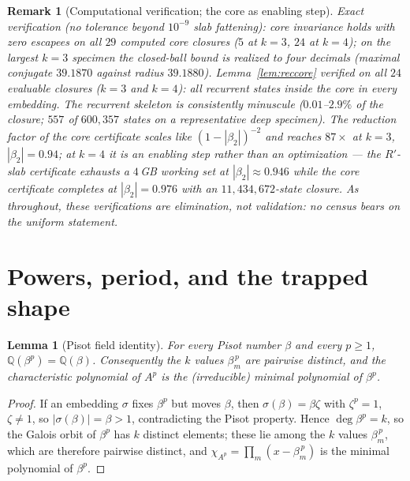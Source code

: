 \documentclass[11pt]{article}
\newtheorem{lemma}[theorem]{Lemma}
\newtheorem{remark}[theorem]{Remark}
\begin{document}
\begin{remark}[Computational verification; the core as enabling step]
\label{rem:coreverif}
Exact verification (no tolerance beyond $10^{-9}$ slab fattening):
core invariance holds with zero escapees on all $29$ computed core
closures ($5$ at $k=3$, $24$ at $k=4$); on the largest $k=3$ specimen
the closed-ball bound is realized to four decimals (maximal conjugate
$39.1870$ against radius $39.1880$). Lemma~\ref{lem:reccore} verified
on all $24$ evaluable closures ($k=3$ and $k=4$): all recurrent states
inside the core in every embedding. The recurrent skeleton is
consistently minuscule ($0.01$--$2.9\%$ of the closure; $557$ of
$600{,}357$ states on a representative deep specimen). The reduction
factor of the core certificate scales like $(1-|\beta_2|)^{-2}$ and
reaches $87\times$ at $k=3$, $|\beta_2|=0.94$; at $k=4$ it is an
\emph{enabling} step rather than an optimization --- the
$R'$-slab certificate exhausts a $4$\,GB working set at
$|\beta_2|\approx0.946$ while the core certificate completes at
$|\beta_2|=0.976$ with an $11{,}434{,}672$-state closure. As throughout,
these verifications are elimination, not validation: no census bears on
the uniform statement.
\end{remark}

\section{Powers, period, and the trapped shape}\label{sec:power}

\begin{lemma}[Pisot field identity]\label{lem:field}
For every Pisot number $\beta$ and every $p\ge1$,
$\mathbb{Q}(\beta^p)=\mathbb{Q}(\beta)$. Consequently the $k$ values
$\beta_m^{\,p}$ are pairwise distinct, and the characteristic polynomial
of $A^p$ is the (irreducible) minimal polynomial of $\beta^p$.
\end{lemma}

\begin{proof}
If an embedding $\sigma$ fixes $\beta^p$ but moves $\beta$, then
$\sigma(\beta)=\beta\zeta$ with $\zeta^p=1$, $\zeta\ne1$, so
$|\sigma(\beta)|=\beta>1$, contradicting the Pisot property. Hence
$\deg\beta^p=k$, so the Galois orbit of $\beta^p$ has $k$ distinct
elements; these lie among the $k$ values $\beta_m^{\,p}$, which are
therefore pairwise distinct, and
$\chi_{A^p}=\prod_m(x-\beta_m^{\,p})$ is the minimal polynomial of
$\beta^p$.
\end{proof}
\end{document}
